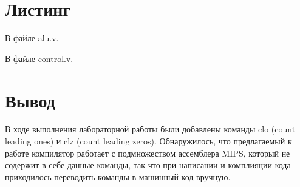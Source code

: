 \documentclass[a4paper, 10pt]{article}
\begin{document}
     \section*{Листинг}
        
        В файле alu.v.
        
        В файле control.v.
        
    \section*{Вывод}
    В ходе выполнения лабораторной работы были добавлены команды clo (count
    leading ones) и clz (count leading zeros). Обнаружилось, что предлагаемый
    к работе компилятор работает с подмножеством ассемблера MIPS, который не
    содержит в себе данные команды, так что при написании и комплияции кода
    приходилось переводить команды в машинный код вручную. 
\end{document}
